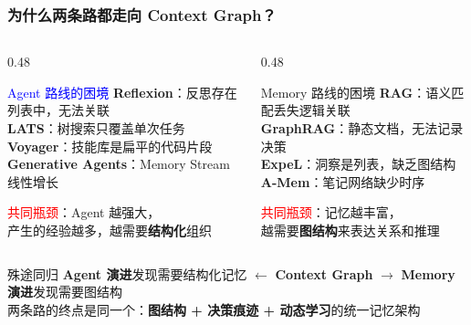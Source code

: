 \documentclass[aspectratio=169,10pt]{beamer}
\begin{document}
\begin{frame}
  \frametitle{为什么两条路都走向 Context Graph？}

  \begin{columns}[T]
    \begin{column}{0.48\textwidth}
      \begin{block}{\textcolor{blue}{Agent 路线的困境}}
        \small
        \textbf{Reflexion}：反思存在列表中，无法关联\\
        \textbf{LATS}：树搜索只覆盖单次任务\\
        \textbf{Voyager}：技能库是扁平的代码片段\\
        \textbf{Generative Agents}：Memory Stream 线性增长
        \vspace{0.2cm}

        \textcolor{red}{共同瓶颈}：Agent 越强大，\\产生的经验越多，越需要\textbf{结构化}组织
      \end{block}
    \end{column}

    \begin{column}{0.48\textwidth}
      \begin{block}{\textcolor{green!50!black}{Memory 路线的困境}}
        \small
        \textbf{RAG}：语义匹配丢失逻辑关联\\
        \textbf{GraphRAG}：静态文档，无法记录决策\\
        \textbf{ExpeL}：洞察是列表，缺乏图结构\\
        \textbf{A-Mem}：笔记网络缺少时序
        \vspace{0.2cm}

        \textcolor{red}{共同瓶颈}：记忆越丰富，\\越需要\textbf{图结构}来表达关系和推理
      \end{block}
    \end{column}
  \end{columns}

  \vspace{0.3cm}

  \begin{alertblock}{殊途同归}
    \textbf{Agent 演进}发现需要结构化记忆 $\leftarrow$ \textbf{Context Graph} $\rightarrow$ \textbf{Memory 演进}发现需要图结构\\[0.1cm]
    两条路的终点是同一个：\textbf{图结构 + 决策痕迹 + 动态学习}的统一记忆架构
  \end{alertblock}
\end{frame}
\end{document}
